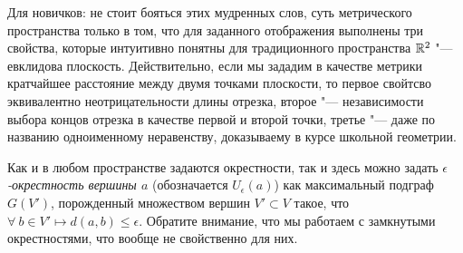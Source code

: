 	Для новичков: не стоит бояться этих мудренных слов, суть метрического пространства только в том, что для заданного отображения выполнены три свойства, которые интуитивно понятны для традиционного пространства $\mathbb{R}^2$ "--- евклидова плоскость. Действительно, если мы зададим в качестве метрики кратчайшее расстояние между двумя точками плоскости, то первое свойтсво эквивалентно неотрицательности длины отрезка, второе "--- независимости выбора концов отрезка в качестве первой и второй точки, третье "--- даже по названию одноименному неравенству, доказываему в курсе школьной геометрии.
	
	Как и в любом пространстве задаются окрестности, так и здесь можно задать \emph{$\epsilon$-окрестность вершины $a$} (обозначается $U_{\epsilon}(a)$) как максимальный подграф $G(V')$, порожденный множеством вершин $V' \subset V$ такое, что $\forall \!\ b \in V' \mapsto d(a, b) \leqslant \epsilon$. Обратите внимание, что мы работаем с замкнутыми окрестностями, что вообще не свойственно для них.
	
